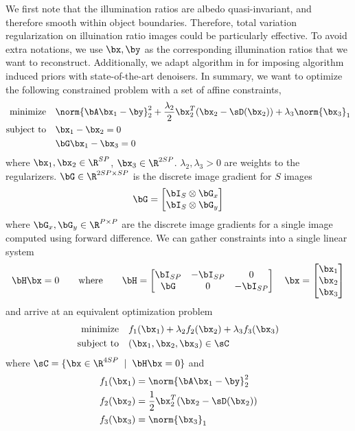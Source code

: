 \documentclass[../writeup.tex]{subfiles}
\begin{document}
We first note that the illumination ratios are albedo quasi-invariant, and therefore smooth within object boundaries. Therefore, total variation regularization on illuination ratio images could be particularly effective. To avoid extra notations, we use $\bx,\by$ as the corresponding illumination ratios that we want to reconstruct. Additionally, we adapt algorithm in \cite{romanoLittleEngineThat2016} for imposing algorithm induced priors with state-of-the-art denoisers. In summary, we want to optimize the following constrained problem with a set of affine constraints,
\begin{align*}
    \minimize  & \norm{\bA\bx_1 - \by}_2^2 + \frac{\lambda_2}{2} \bx_2^T(\bx_2 - \sD(\bx_2)) + \lambda_3 \norm{\bx_3}_1 \\
    \subjectto & \bx_1 - \bx_2 = 0 \\
               & \bG\bx_1 - \bx_3 = 0 \\
\end{align*}
where $\bx_1,\bx_2\in\R^{SP}$, $\bx_3\in\R^{2SP}$. $\lambda_2,\lambda_3>0$ are weights to the regularizers. $\bG\in \R^{2SP\times SP}$ is the discrete image gradient for $S$ images 
\[
    \bG =
    \begin{bmatrix}
        \bI_S \otimes \bG_x \\
        \bI_S \otimes \bG_y \\
    \end{bmatrix} 
\]
where $\bG_x,\bG_y\in\R^{P\times P}$ are the discrete image gradients for a single image computed using forward difference. We can gather constraints into a single linear system 
\[
    \bH\bx = 0
    \quad\quad \text{where}\quad\quad
    \bH = 
    \begin{bmatrix}
        \bI_{SP} & -\bI_{SP} & 0  \\
        \bG    & 0    & -\bI_{SP}  \\
    \end{bmatrix}
    \quad
    \bx = 
    \begin{bmatrix}
        \bx_1 \\ \bx_2 \\ \bx_3
    \end{bmatrix}
\]
and arrive at an equivalent optimization problem
\begin{equation}
    \label{eq:method_optimization_problem}
    \begin{aligned}
        \minimize  & f_1(\bx_1) + \lambda_2 f_2(\bx_2) + \lambda_3 f_3(\bx_3) \\
        \subjectto & (\bx_1,\bx_2,\bx_3) \in \sC
    \end{aligned}
\end{equation}
where $\sC = \{\bx\in\R^{4SP} \;\mid\; \bH\bx = 0\}$ and 
\begin{align*}
    f_1(\bx_1)
        &=\norm{\bA\bx_1 - \by}_2^2 \\
    f_2(\bx_2)
        &=\frac{1}{2} \bx_2^T(\bx_2 - \sD(\bx_2)) \\
    f_3(\bx_3)
        &=\norm{\bx_3}_1
\end{align*}
\end{document}
